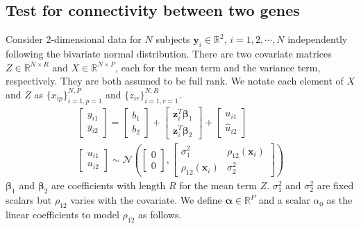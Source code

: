 \documentclass[aap,authoryear, preprint]{imsart}
\numberwithin{equation}{section}
\theoremstyle{plain}
\begin{document}
\subsection{Test for connectivity between two genes \label{sec:framework2}}
Consider 2-dimensional data for $N$ subjects $\bm{y}_i \in \mathbb{R}^2$, $i = 1, 2, \cdots, N$ independently following the bivariate normal distribution. There are two covariate matrices $Z \in \mathbb{R}^{N \times R}$ and $X \in \mathbb{R}^{N \times P}$, each for the mean term and the variance term, respectively. They are both assumed to be full rank. We notate each element of $X$ and $Z$ as $\{x_{ip}\}_{i=1,p=1}^{N,P}$ and $\{z_{ir}\}_{i=1,r=1}^{N,R}$.
\begin{equation}
\begin{multlined}
    \begin{bmatrix} y_{i1} \\ y_{i2} \end{bmatrix} = 
    \begin{bmatrix} b_{1} \\ b_{2} \end{bmatrix} + 
    \begin{bmatrix} \bm{z}_i^T \bm{\beta}_1 \\ \bm{z}_i^T \bm{\beta}_2 \end{bmatrix} + 
    \begin{bmatrix} {u_{i1}} \\ {\hat{u}_{i2}} \end{bmatrix}\\
    \begin{bmatrix} {u_{i1}} \\ u_{i2} \end{bmatrix} 
    \sim \mathcal{N}\left(
        \begin{bmatrix} 0 \\ 0 \end{bmatrix}, 
        \begin{bmatrix} \sigma_1^2 & \rho_{12}(\bm{x}_i) \\ 
        \rho_{12}(\bm{x}_i) & \sigma_2^2 \end{bmatrix}
    \right)
    \end{multlined}
    \label{eq:framework_2genes}
\end{equation}
$\bm{\beta}_1$ and $\bm{\beta}_2$ are coefficients with length $R$  for the mean term $Z$. $\sigma_1^2$ and $\sigma_2^2$ are fixed scalars but $\rho_{12}$ varies with the covariate. We define $\bm{\alpha} \in \mathbb{R}^{P}$ and a scalar $\alpha_0$ as the linear coefficients to model $\rho_{12}$ as follows.
\end{document}
